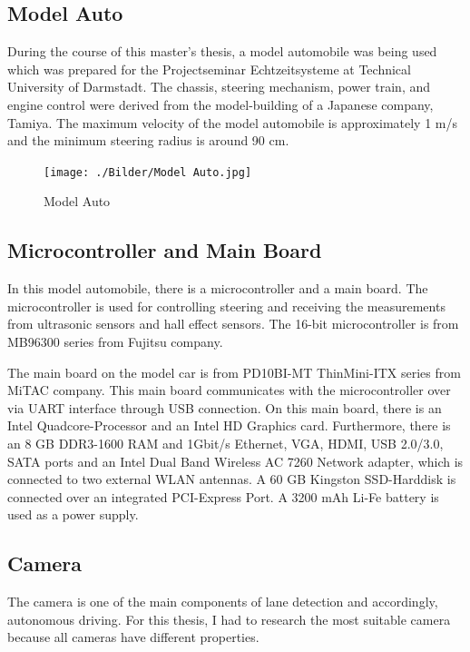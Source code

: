 %
\subsection{Model Auto}\label{sec:Model Auto}


During the course of this master's thesis, a model automobile was being used which was prepared for the Projectseminar 
Echtzeitsysteme at Technical University of Darmstadt. The chassis, steering mechanism, power train, and engine control 
were derived from the model-building of a Japanese company, Tamiya. The maximum velocity of the model automobile is 
approximately 1 m/s and the minimum steering radius is around 90 cm. 

\begin{figure}[H]
	\centering
	\hspace*{0cm}   
	\texttt{[image: ./Bilder/Model Auto.jpg]}
	\caption{Model Auto}
\end{figure}

%
\subsection{Microcontroller and Main Board}\label{sec:Microcontroller and Main Board}


In this model automobile, there is a microcontroller and a main board. The microcontroller is used for controlling steering 
and receiving the measurements from ultrasonic sensors and hall effect sensors. The 16-bit microcontroller is from 
MB96300 series from Fujitsu company.

The main board on the model car is from PD10BI-MT ThinMini-ITX series from MiTAC company. This main board communicates 
with the microcontroller over via UART interface through USB connection. On this main board, there is an Intel 
Quadcore-Processor and an Intel HD Graphics card. Furthermore, there is an 8 GB DDR3-1600 RAM and 1Gbit/s Ethernet, VGA, HDMI, USB 2.0/3.0, SATA ports and an Intel Dual Band Wireless AC 7260 Network adapter, which is connected to two external WLAN antennas. A 60 GB Kingston SSD-Harddisk is connected over an integrated PCI-Express Port. A 3200 mAh Li-Fe battery is used as a power supply.
%

\subsection{Camera}\label{sec:Camera}


The camera is one of the main components of lane detection and accordingly, autonomous driving. For this thesis, I had 
to research the most suitable camera because all cameras have different properties.

